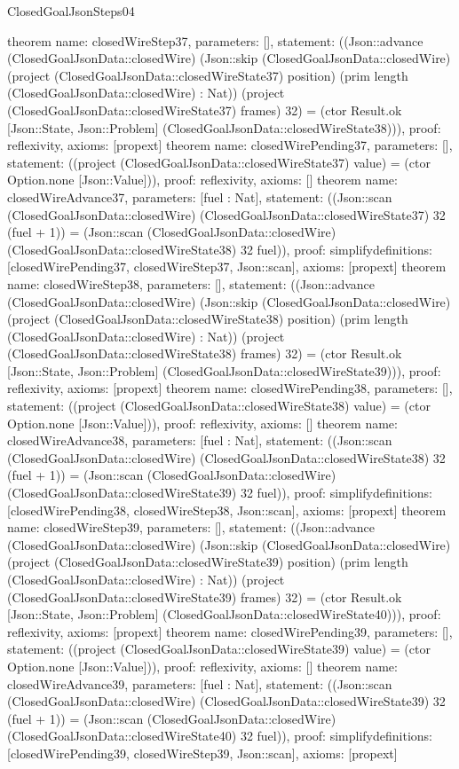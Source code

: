 \begin{lexlean}{ClosedGoalJsonSteps04}
\begin{semanticmodule}
{}
theorem{
 name: closedWireStep37, parameters: [],
 statement: ((Json::advance (ClosedGoalJsonData::closedWire) (Json::skip (ClosedGoalJsonData::closedWire) (project (ClosedGoalJsonData::closedWireState37) position) (prim length (ClosedGoalJsonData::closedWire) : Nat)) (project (ClosedGoalJsonData::closedWireState37) frames) 32) = (ctor Result.ok [Json::State, Json::Problem] (ClosedGoalJsonData::closedWireState38))), proof: reflexivity{}, axioms: [propext]
}
theorem{
 name: closedWirePending37, parameters: [],
 statement: ((project (ClosedGoalJsonData::closedWireState37) value) = (ctor Option.none [Json::Value])), proof: reflexivity{}, axioms: []
}
theorem{
 name: closedWireAdvance37, parameters: [fuel : Nat],
 statement: ((Json::scan (ClosedGoalJsonData::closedWire) (ClosedGoalJsonData::closedWireState37) 32 (fuel + 1)) = (Json::scan (ClosedGoalJsonData::closedWire) (ClosedGoalJsonData::closedWireState38) 32 fuel)), proof: simplify{definitions: [closedWirePending37, closedWireStep37, Json::scan]}, axioms: [propext]
}
theorem{
 name: closedWireStep38, parameters: [],
 statement: ((Json::advance (ClosedGoalJsonData::closedWire) (Json::skip (ClosedGoalJsonData::closedWire) (project (ClosedGoalJsonData::closedWireState38) position) (prim length (ClosedGoalJsonData::closedWire) : Nat)) (project (ClosedGoalJsonData::closedWireState38) frames) 32) = (ctor Result.ok [Json::State, Json::Problem] (ClosedGoalJsonData::closedWireState39))), proof: reflexivity{}, axioms: [propext]
}
theorem{
 name: closedWirePending38, parameters: [],
 statement: ((project (ClosedGoalJsonData::closedWireState38) value) = (ctor Option.none [Json::Value])), proof: reflexivity{}, axioms: []
}
theorem{
 name: closedWireAdvance38, parameters: [fuel : Nat],
 statement: ((Json::scan (ClosedGoalJsonData::closedWire) (ClosedGoalJsonData::closedWireState38) 32 (fuel + 1)) = (Json::scan (ClosedGoalJsonData::closedWire) (ClosedGoalJsonData::closedWireState39) 32 fuel)), proof: simplify{definitions: [closedWirePending38, closedWireStep38, Json::scan]}, axioms: [propext]
}
theorem{
 name: closedWireStep39, parameters: [],
 statement: ((Json::advance (ClosedGoalJsonData::closedWire) (Json::skip (ClosedGoalJsonData::closedWire) (project (ClosedGoalJsonData::closedWireState39) position) (prim length (ClosedGoalJsonData::closedWire) : Nat)) (project (ClosedGoalJsonData::closedWireState39) frames) 32) = (ctor Result.ok [Json::State, Json::Problem] (ClosedGoalJsonData::closedWireState40))), proof: reflexivity{}, axioms: [propext]
}
theorem{
 name: closedWirePending39, parameters: [],
 statement: ((project (ClosedGoalJsonData::closedWireState39) value) = (ctor Option.none [Json::Value])), proof: reflexivity{}, axioms: []
}
theorem{
 name: closedWireAdvance39, parameters: [fuel : Nat],
 statement: ((Json::scan (ClosedGoalJsonData::closedWire) (ClosedGoalJsonData::closedWireState39) 32 (fuel + 1)) = (Json::scan (ClosedGoalJsonData::closedWire) (ClosedGoalJsonData::closedWireState40) 32 fuel)), proof: simplify{definitions: [closedWirePending39, closedWireStep39, Json::scan]}, axioms: [propext]
}
\end{semanticmodule}
\end{lexlean}

